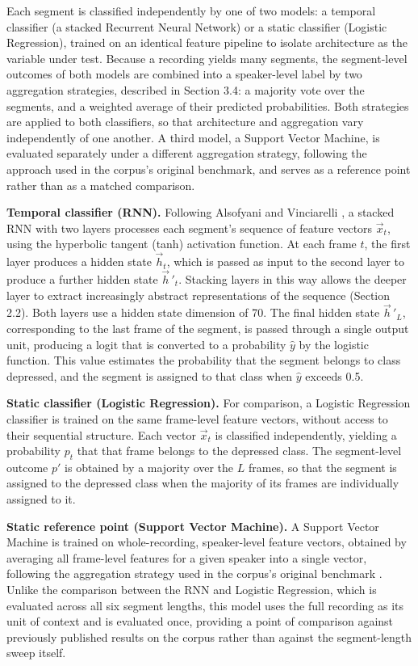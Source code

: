 \documentclass{mproj}
\begin{document}
Each segment is classified independently by one of two models: a temporal classifier (a stacked Recurrent Neural Network) or a static classifier (Logistic Regression), trained on an identical feature pipeline to isolate architecture as the variable under test. Because a recording yields many segments, the segment-level outcomes of both models are combined into a speaker-level label by two aggregation strategies, described in Section 3.4: a majority vote over the segments, and a weighted average of their predicted probabilities. Both strategies are applied to both classifiers, so that architecture and aggregation vary independently of one another. A third model, a Support Vector Machine, is evaluated separately under a different aggregation strategy, following the approach used in the corpus's original benchmark, and serves as a reference point rather than as a matched comparison.

\textbf{Temporal classifier (RNN).} Following Alsofyani and Vinciarelli \cite{alsofyani2021}, a stacked RNN with two layers processes each segment's sequence of feature vectors $\vec{x}_t$, using the hyperbolic tangent (tanh) activation function. At each frame $t$, the first layer produces a hidden state $\vec{h}_t$, which is passed as input to the second layer to produce a further hidden state $\vec{h}\,'_t$. Stacking layers in this way allows the deeper layer to extract increasingly abstract representations of the sequence (Section 2.2). Both layers use a hidden state dimension of 70. The final hidden state $\vec{h}\,'_L$, corresponding to the last frame of the segment, is passed through a single output unit, producing a logit that is converted to a probability $\hat{y}$ by the logistic function. This value estimates the probability that the segment belongs to class depressed, and the segment is assigned to that class when $\hat{y}$ exceeds 0.5.

\textbf{Static classifier (Logistic Regression).} For comparison, a Logistic Regression classifier is trained on the same frame-level feature vectors, without access to their sequential structure. Each vector $\vec{x}_t$ is classified independently, yielding a probability $p_t$ that that frame belongs to the depressed class. The segment-level outcome $p'$ is obtained by a majority over the $L$ frames, so that the segment is assigned to the depressed class when the majority of its frames are individually assigned to it.

\textbf{Static reference point (Support Vector Machine).} A Support Vector Machine is trained on whole-recording, speaker-level feature vectors, obtained by averaging all frame-level features for a given speaker into a single vector, following the aggregation strategy used in the corpus's original benchmark \cite{tao2023androids}. Unlike the comparison between the RNN and Logistic Regression, which is evaluated across all six segment lengths, this model uses the full recording as its unit of context and is evaluated once, providing a point of comparison against previously published results on the corpus rather than against the segment-length sweep itself.
\end{document}
